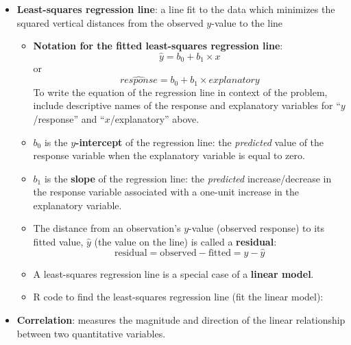 \documentclass[
]{report}
\newenvironment{Shaded}{\begin{snugshade}}{\end{snugshade}}
\newcommand{\AttributeTok}[1]{\textcolor[rgb]{0.13,0.29,0.53}{#1}}
\newcommand{\CommentTok}[1]{\textcolor[rgb]{0.56,0.35,0.01}{\textit{#1}}}
\newcommand{\DecValTok}[1]{\textcolor[rgb]{0.00,0.00,0.81}{#1}}
\newcommand{\FunctionTok}[1]{\textcolor[rgb]{0.13,0.29,0.53}{\textbf{#1}}}
\newcommand{\NormalTok}[1]{#1}
\newcommand{\OtherTok}[1]{\textcolor[rgb]{0.56,0.35,0.01}{#1}}
\newcommand{\SpecialCharTok}[1]{\textcolor[rgb]{0.81,0.36,0.00}{\textbf{#1}}}
\begin{document}
\begin{itemize}
\item
  \textbf{Least-squares regression line}: a line fit to the data which minimizes the squared vertical distances from the observed \(y\)-value to the line

  \begin{itemize}
  \item
    \textbf{Notation for the fitted least-squares regression line}:
    \[\hat{y} = b_0 + b_1 \times x\]
    or
    \[\widehat{response} = b_0 + b_1 \times explanatory\]
    To write the equation of the regression line in context of the problem, include descriptive names of the response and explanatory variables for ``\(y\)/response'' and ``\(x\)/explanatory'' above.
  \item
    \(b_0\) is the \textbf{\(y\)-intercept} of the regression line: the \emph{predicted} value of the response variable when the explanatory variable is equal to zero.
  \item
    \(b_1\) is the \textbf{slope} of the regression line: the \emph{predicted} increase/decrease in the response variable associated with a one-unit increase in the explanatory variable.
  \item
    The distance from an observation's \(y\)-value (observed response) to its fitted value, \(\hat{y}\) (the value on the line) is called a \textbf{residual}:
    \[ \text{residual} = \text{observed} - \text{fitted} = y - \hat{y}\]
  \item
    A least-squares regression line is a special case of a \textbf{linear model}.
  \item
    R code to find the least-squares regression line (fit the linear model):
  \end{itemize}

\begin{Shaded}
\end{Shaded}
\item
  \textbf{Correlation}: measures the magnitude and direction of the linear relationship between two quantitative variables.


\end{itemize}
\end{document}
